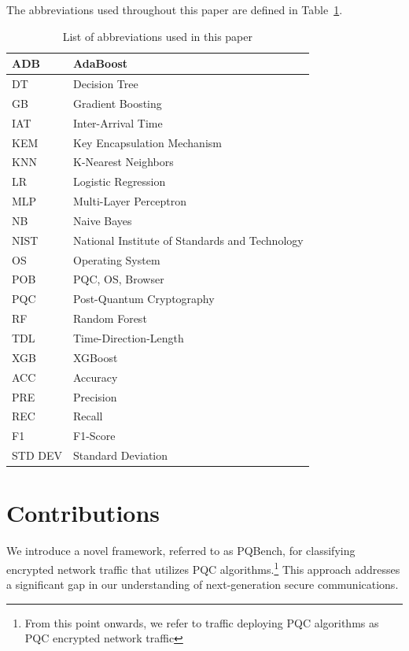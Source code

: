 \documentclass[10pt,journal]{IEEEtran}%
\begin{document}
The abbreviations used throughout this paper are defined in Table~\ref{tab:abbreviations}.
\begin{table}[h]
\centering
\caption{List of abbreviations used in this paper}
\label{tab:abbreviations}
\begin{tabular}{|l|l|}
\hline
ADB & AdaBoost \\
\hline
DT & Decision Tree \\
\hline
GB & Gradient Boosting \\
\hline
IAT & Inter-Arrival Time \\
\hline
KEM & Key Encapsulation Mechanism \\
\hline
KNN & K-Nearest Neighbors \\
\hline
LR & Logistic Regression \\
\hline
MLP & Multi-Layer Perceptron \\
\hline
NB & Naive Bayes \\
\hline
NIST & National Institute of Standards and Technology \\
\hline
OS & Operating System \\
\hline
POB & PQC, OS, Browser \\
\hline
PQC & Post-Quantum Cryptography \\
\hline
RF & Random Forest \\
\hline
TDL & Time-Direction-Length \\
\hline
XGB & XGBoost \\
\hline
ACC & Accuracy \\
\hline
PRE & Precision \\
\hline
REC & Recall \\
\hline
F1 & F1-Score \\
\hline
STD DEV & Standard Deviation \\
\hline
\end{tabular}
\end{table}


\section{Contributions}
\label{sec:cont}
We introduce a novel framework, referred to as PQBench, for classifying encrypted network traffic that utilizes PQC algorithms.\footnote{From this point onwards, we refer to traffic deploying PQC algorithms as PQC encrypted network traffic} This approach addresses a significant gap in our understanding of next-generation secure communications.
\end{document}
